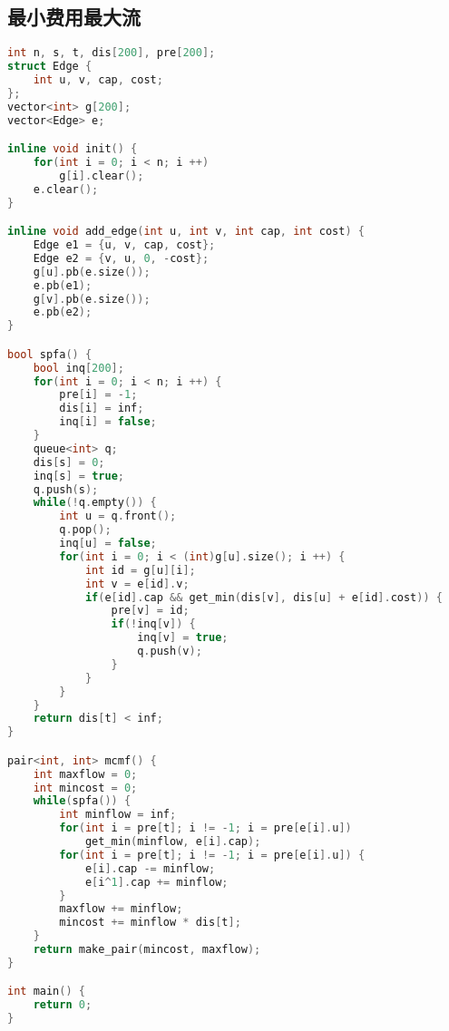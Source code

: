 \subsection{最小费用最大流}
    \begin{lstlisting}[language=c++]
int n, s, t, dis[200], pre[200];
struct Edge {
    int u, v, cap, cost;
};
vector<int> g[200];
vector<Edge> e;

inline void init() {
    for(int i = 0; i < n; i ++)
        g[i].clear();
    e.clear();
}

inline void add_edge(int u, int v, int cap, int cost) {
    Edge e1 = {u, v, cap, cost};
    Edge e2 = {v, u, 0, -cost};
    g[u].pb(e.size());
    e.pb(e1);
    g[v].pb(e.size());
    e.pb(e2);
}

bool spfa() {
    bool inq[200];
    for(int i = 0; i < n; i ++) {
        pre[i] = -1;
        dis[i] = inf;
        inq[i] = false;
    }
    queue<int> q;
    dis[s] = 0;
    inq[s] = true;
    q.push(s);
    while(!q.empty()) {
        int u = q.front();
        q.pop();
        inq[u] = false;
        for(int i = 0; i < (int)g[u].size(); i ++) {
            int id = g[u][i];
            int v = e[id].v;
            if(e[id].cap && get_min(dis[v], dis[u] + e[id].cost)) {
                pre[v] = id;
                if(!inq[v]) {
                    inq[v] = true;
                    q.push(v);
                }
            }
        }
    }
    return dis[t] < inf;
}

pair<int, int> mcmf() {
    int maxflow = 0;
    int mincost = 0;
    while(spfa()) {
        int minflow = inf;
        for(int i = pre[t]; i != -1; i = pre[e[i].u]) 
            get_min(minflow, e[i].cap);
        for(int i = pre[t]; i != -1; i = pre[e[i].u]) {
            e[i].cap -= minflow;
            e[i^1].cap += minflow;
        }
        maxflow += minflow;
        mincost += minflow * dis[t];
    }
    return make_pair(mincost, maxflow);
}

int main() {
    return 0;
}
    \end{lstlisting}
